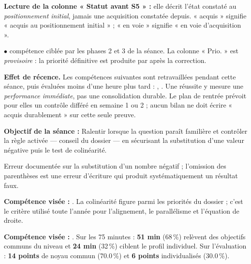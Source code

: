 \documentclass[10pt,a4paper]{article}
\begin{document}
\par\vspace{1mm}\small\textbf{Lecture de la colonne « Statut avant S5 » :} elle décrit l'état constaté au \emph{positionnement initial}, jamais une acquisition constatée depuis. « acquis » signifie « acquis au positionnement initial » ; « en voie » signifie « en voie d'acquisition ».
\par\small$\bullet$ compétence ciblée par les phases 2 et 3 de la séance. La colonne « Prio. » est \emph{provisoire} : la priorité définitive est produite par  après la correction.
\begin{warningbox}\textbf{Effet de récence.} Les compétences suivantes sont retravaillées pendant cette séance, puis évaluées moins d'une heure plus tard : , . Une réussite y mesure une \emph{performance immédiate}, pas une consolidation durable. Le plan de rentrée prévoit pour elles un contrôle différé en semaine 1 ou 2 ; aucun bilan ne doit écrire « acquis durablement » sur cette seule preuve.\end{warningbox}
\begin{goalbox}\textbf{Objectif de la séance :} Ralentir lorsque la question paraît familière et contrôler la règle activée — conseil du dossier — en sécurisant la substitution d'une valeur négative puis le test de colinéarité.\end{goalbox}
Erreur documentée sur la substitution d'un nombre négatif ; l'omission des parenthèses est une erreur d'écriture qui produit systématiquement un résultat faux.
\par\vspace{1mm}\textbf{Compétence visée :} .
La colinéarité figure parmi les priorités du dossier ; c'est le critère utilisé toute l'année pour l'alignement, le parallélisme et l'équation de droite.
\par\vspace{1mm}\textbf{Compétence visée :} .
Sur les 75 minutes : \textbf{51 min} (68\,\%) relèvent des objectifs communs du niveau et \textbf{24 min} (32\,\%) ciblent le profil individuel. Sur l'évaluation : \textbf{14 points} de noyau commun (70.0\,\%) et \textbf{6 points} individualisés (30.0\,\%).
\end{document}
